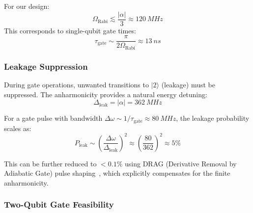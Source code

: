 For our design:
\begin{equation}
\Omega_{\text{Rabi}} \lesssim \frac{|\alpha|}{3} \approx \SI{120}{MHz}
\end{equation}
This corresponds to single-qubit gate times:
\begin{equation}
\tau_{\text{gate}} \sim \frac{\pi}{2\Omega_{\text{Rabi}}} \approx \SI{13}{ns}
\end{equation}

\subsubsection{Leakage Suppression}

During gate operations, unwanted transitions to $|2\rangle$ (leakage) must be suppressed. The anharmonicity provides a natural energy detuning:
\begin{equation}
\Delta_{\text{leak}} = |\alpha| = \SI{362}{MHz}
\end{equation}

For a gate pulse with bandwidth $\Delta\omega \sim 1/\tau_{\text{gate}} \approx \SI{80}{MHz}$, the leakage probability scales as:
\begin{equation}
P_{\text{leak}} \sim \left(\frac{\Delta\omega}{\Delta_{\text{leak}}}\right)^2 \approx \left(\frac{80}{362}\right)^2 \approx 5\%
\end{equation}

This can be further reduced to $< 0.1\%$ using DRAG (Derivative Removal by Adiabatic Gate) pulse shaping~\cite{Motzoi2009}, which explicitly compensates for the finite anharmonicity.

\subsubsection{Two-Qubit Gate Feasibility}

